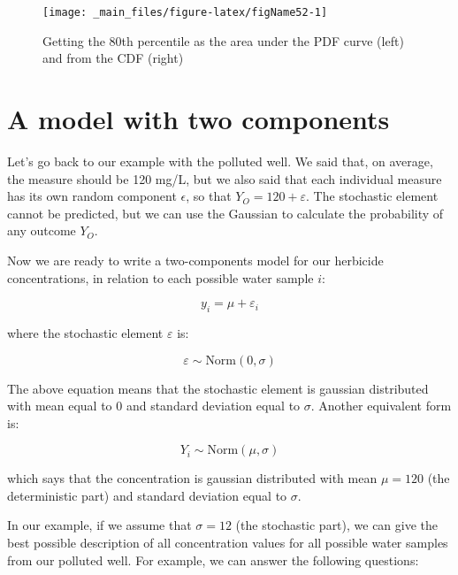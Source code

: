 \documentclass[a4paper,12pt,oneside]{book}
\begin{document}
\begin{figure}

{\centering \texttt{[image: \_main\_files/figure-latex/figName52-1]} 

}

\caption{Getting the 80th percentile as the area under the PDF curve (left) and from the CDF (right)}\label{fig:figName52}
\end{figure}

\hypertarget{a-model-with-two-components}{%
\section{A model with two components}\label{a-model-with-two-components}}

Let's go back to our example with the polluted well. We said that, on average, the measure should be 120 mg/L, but we also said that each individual measure has its own random component \(\epsilon\), so that \(Y_O = 120 + \varepsilon\). The stochastic element cannot be predicted, but we can use the Gaussian to calculate the probability of any outcome \(Y_O\).

Now we are ready to write a two-components model for our herbicide concentrations, in relation to each possible water sample \(i\):

\[y_i = \mu + \varepsilon_i\]

where the stochastic element \(\varepsilon\) is:

\[ \varepsilon \sim \textrm{Norm}(0, \sigma) \]

The above equation means that the stochastic element is gaussian distributed with mean equal to 0 and standard deviation equal to \(\sigma\). Another equivalent form is:

\[Y_i \sim \textrm{Norm}(\mu, \sigma)\]

which says that the concentration is gaussian distributed with mean \(\mu = 120\) (the deterministic part) and standard deviation equal to \(\sigma\).

In our example, if we assume that \(\sigma = 12\) (the stochastic part), we can give the best possible description of all concentration values for all possible water samples from our polluted well. For example, we can answer the following questions:
\end{document}
